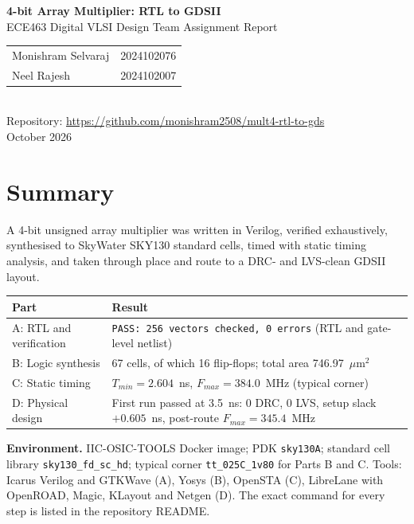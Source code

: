 \documentclass[11pt,a4paper]{article}
\newcommand{\umsq}{\ensuremath{\mu\mathrm{m}^2}}
\begin{document}
\begin{center}
  {\LARGE\bfseries 4-bit Array Multiplier: RTL to GDSII}\\[6pt]
  {\large ECE463 Digital VLSI Design \textbar{} Team Assignment Report}\\[12pt]
  \begin{tabular}{ll}
    Monishram Selvaraj & 2024102076 \\
    Neel Rajesh        & 2024102007
  \end{tabular}\\[8pt]
  Repository: \url{https://github.com/monishram2508/mult4-rtl-to-gds}\\[2pt]
  October 2026
\end{center}

\section{Summary}

A 4-bit unsigned array multiplier was written in Verilog, verified exhaustively,
synthesised to SkyWater SKY130 standard cells, timed with static timing analysis,
and taken through place and route to a DRC- and LVS-clean GDSII layout.

\begin{table}[H]
\centering
\begin{tabularx}{\textwidth}{lY}
\toprule
Part & Result \\
\midrule
A: RTL and verification & \texttt{PASS: 256 vectors checked, 0 errors} (RTL and gate-level netlist) \\
B: Logic synthesis      & 67 cells, of which 16 flip-flops; total area 746.97~\umsq{} \\
C: Static timing        & $T_{min} = 2.604$~ns, $F_{max} = 384.0$~MHz (typical corner) \\
D: Physical design      & First run passed at 3.5~ns: 0 DRC, 0 LVS, setup slack $+0.605$~ns, post-route $F_{max} = 345.4$~MHz \\
\bottomrule
\end{tabularx}
\end{table}

\textbf{Environment.} IIC-OSIC-TOOLS Docker image; PDK \texttt{sky130A}; standard
cell library \texttt{sky130\_fd\_sc\_hd}; typical corner \texttt{tt\_025C\_1v80}
for Parts B and C. Tools: Icarus Verilog and GTKWave (A), Yosys (B), OpenSTA (C),
LibreLane with OpenROAD, Magic, KLayout and Netgen (D). The exact command for
every step is listed in the repository README.
\end{document}
